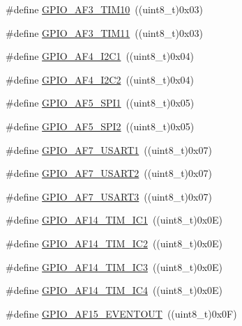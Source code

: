 \begin{DoxyCompactItemize}
\item 
\#define \hyperlink{group___g_p_i_o_ex___alternate__function__selection_ga567ff1ffeab3cb7174bece2c81249e06}{G\-P\-I\-O\-\_\-\-A\-F3\-\_\-\-T\-I\-M10}~((uint8\-\_\-t)0x03)
\item 
\#define \hyperlink{group___g_p_i_o_ex___alternate__function__selection_ga2530afd8e3d67fa86c19362bc5f4b86f}{G\-P\-I\-O\-\_\-\-A\-F3\-\_\-\-T\-I\-M11}~((uint8\-\_\-t)0x03)
\item 
\#define \hyperlink{group___g_p_i_o_ex___alternate__function__selection_ga756e49236633954d1e86cc01c03fb518}{G\-P\-I\-O\-\_\-\-A\-F4\-\_\-\-I2\-C1}~((uint8\-\_\-t)0x04)
\item 
\#define \hyperlink{group___g_p_i_o_ex___alternate__function__selection_gac0a21510acee65b71f4f9da497de8834}{G\-P\-I\-O\-\_\-\-A\-F4\-\_\-\-I2\-C2}~((uint8\-\_\-t)0x04)
\item 
\#define \hyperlink{group___g_p_i_o_ex___alternate__function__selection_gafb369e90efa49bcc298fd354b79cf11a}{G\-P\-I\-O\-\_\-\-A\-F5\-\_\-\-S\-P\-I1}~((uint8\-\_\-t)0x05)
\item 
\#define \hyperlink{group___g_p_i_o_ex___alternate__function__selection_ga0f61d8c59eaf80aec23bbe58c64bc11d}{G\-P\-I\-O\-\_\-\-A\-F5\-\_\-\-S\-P\-I2}~((uint8\-\_\-t)0x05)
\item 
\#define \hyperlink{group___g_p_i_o_ex___alternate__function__selection_gaac2ed5738651fabba7e3163c4c06c410}{G\-P\-I\-O\-\_\-\-A\-F7\-\_\-\-U\-S\-A\-R\-T1}~((uint8\-\_\-t)0x07)
\item 
\#define \hyperlink{group___g_p_i_o_ex___alternate__function__selection_gad7f3d45700eb37dba0a5be513865fd35}{G\-P\-I\-O\-\_\-\-A\-F7\-\_\-\-U\-S\-A\-R\-T2}~((uint8\-\_\-t)0x07)
\item 
\#define \hyperlink{group___g_p_i_o_ex___alternate__function__selection_ga738f78fdc33cf2bdc3144dd1397c7237}{G\-P\-I\-O\-\_\-\-A\-F7\-\_\-\-U\-S\-A\-R\-T3}~((uint8\-\_\-t)0x07)
\item 
\#define \hyperlink{group___g_p_i_o_ex___alternate__function__selection_ga467b88d8a2a6fd517e55fbe10bf36a07}{G\-P\-I\-O\-\_\-\-A\-F14\-\_\-\-T\-I\-M\-\_\-\-I\-C1}~((uint8\-\_\-t)0x0\-E)
\item 
\#define \hyperlink{group___g_p_i_o_ex___alternate__function__selection_ga7fe53f8e7e090401032b392cc50fe1be}{G\-P\-I\-O\-\_\-\-A\-F14\-\_\-\-T\-I\-M\-\_\-\-I\-C2}~((uint8\-\_\-t)0x0\-E)
\item 
\#define \hyperlink{group___g_p_i_o_ex___alternate__function__selection_ga2b215c7a53093fc5579f106dfc5373c4}{G\-P\-I\-O\-\_\-\-A\-F14\-\_\-\-T\-I\-M\-\_\-\-I\-C3}~((uint8\-\_\-t)0x0\-E)
\item 
\#define \hyperlink{group___g_p_i_o_ex___alternate__function__selection_ga7cf8289eecf398dca2765f5d8ac94076}{G\-P\-I\-O\-\_\-\-A\-F14\-\_\-\-T\-I\-M\-\_\-\-I\-C4}~((uint8\-\_\-t)0x0\-E)
\item 
\#define \hyperlink{group___g_p_i_o_ex___alternate__function__selection_ga6a9e7cd61d906b36a1044acef59d245e}{G\-P\-I\-O\-\_\-\-A\-F15\-\_\-\-E\-V\-E\-N\-T\-O\-U\-T}~((uint8\-\_\-t)0x0\-F)
\end{DoxyCompactItemize}


